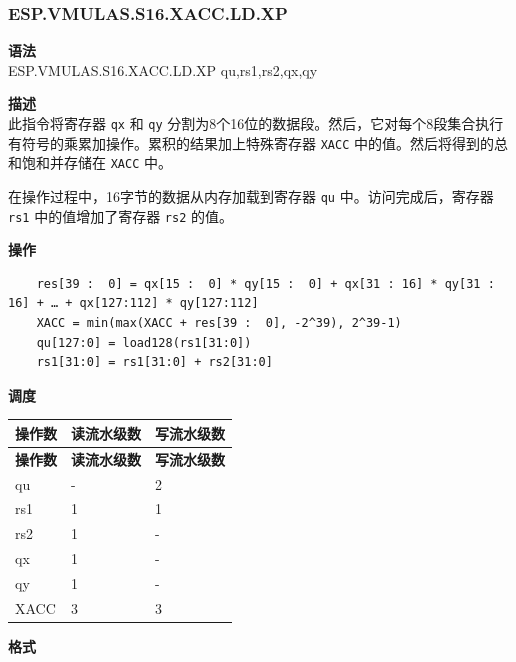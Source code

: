 \newpage
\subsubsection{ESP.VMULAS.S16.XACC.LD.XP}\label{instruction:ESPVMULASS16XACCLDXP}
\textbf{语法}\\
ESP.VMULAS.S16.XACC.LD.XP qu,rs1,rs2,qx,qy

\textbf{描述}\\
此指令将寄存器 \lstinline{qx} 和 \lstinline{qy} 分割为8个16位的数据段。然后，它对每个8段集合执行有符号的乘累加操作。累积的结果加上特殊寄存器 \lstinline{XACC} 中的值。然后将得到的总和饱和并存储在 \lstinline{XACC} 中。

在操作过程中，16字节的数据从内存加载到寄存器 \lstinline{qu} 中。访问完成后，寄存器 \lstinline{rs1} 中的值增加了寄存器 \lstinline{rs2} 的值。

\textbf{操作}\\
\begin{lstlisting}
    res[39 :  0] = qx[15 :  0] * qy[15 :  0] + qx[31 : 16] * qy[31 : 16] + … + qx[127:112] * qy[127:112]
    XACC = min(max(XACC + res[39 :  0], -2^39), 2^39-1)
    qu[127:0] = load128(rs1[31:0])
    rs1[31:0] = rs1[31:0] + rs2[31:0]
\end{lstlisting}

\textbf{调度}\\
\begin{longtable}[c]{|l|l|l|}
    \hline
    \rowcolor{lightgray}
    \textbf{操作数} & \textbf{读流水级数} & \textbf{写流水级数} \\\hline
    \endfirsthead
    \hline
    \rowcolor{lightgray}
     \textbf{操作数} & \textbf{读流水级数} & \textbf{写流水级数} \\\hline
    \endhead
    \hline
    \endfoot

    qu & - & 2 \\\hline
    rs1 & 1 & 1 \\\hline
    rs2 & 1 & - \\\hline
     qx & 1 & - \\\hline
     qy & 1 & - \\\hline
     XACC & 3 & 3
\end{longtable}

\textbf{格式}\\

